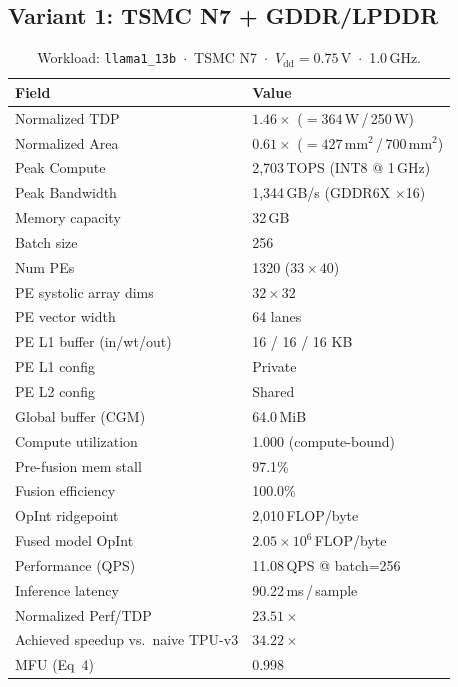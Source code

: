 \subsection{Variant 1: TSMC N7 + GDDR/LPDDR}
\label{app:n7}
\begin{table}[h]
\centering
\caption{Workload: \texttt{llama1\_13b}~$\cdot$~TSMC N7~$\cdot$~$V_\text{dd}=0.75$\,V~$\cdot$~1.0\,GHz.}
\label{tab:cheetah_v1_llama1_13b}
\small\setlength{\tabcolsep}{6pt}
\begin{tabular}{@{}ll@{}}
\toprule
\textbf{Field} & \textbf{Value} \\
\midrule
Normalized TDP          & $1.46\times$ ($= 364$\,W\,/\,250\,W) \\
Normalized Area         & $0.61\times$ ($= 427$\,mm$^2$\,/\,700\,mm$^2$) \\
Peak Compute            & 2{,}703\,TOPS (INT8 @ 1\,GHz) \\
Peak Bandwidth          & 1{,}344\,GB/s (GDDR6X $\times$16) \\
Memory capacity         & 32\,GB \\
Batch size              & 256 \\
Num PEs                 & 1320 ($33 \times 40$) \\
PE systolic array dims  & $32 \times 32$ \\
PE vector width         & 64 lanes \\
PE L1 buffer (in/wt/out) & 16 / 16 / 16 KB \\
PE L1 config            & Private \\
PE L2 config            & Shared \\
Global buffer (CGM)     & 64.0\,MiB \\
\midrule
Compute utilization     & 1.000 (compute-bound) \\
Pre-fusion mem stall    & 97.1\% \\
Fusion efficiency       & 100.0\% \\
OpInt ridgepoint        & 2{,}010\,FLOP/byte \\
Fused model OpInt       & $2.05 \times 10^{6}$\,FLOP/byte \\
Performance (QPS)       & 11.08\,QPS @ batch=256 \\
Inference latency       & 90.22\,ms\,/\,sample \\
Normalized Perf/TDP     & $23.51\times$ \\
Achieved speedup vs.\ naive TPU-v3 & $34.22\times$ \\
MFU (Eq~4)              & 0.998 \\

\end{tabular}
\end{table}
